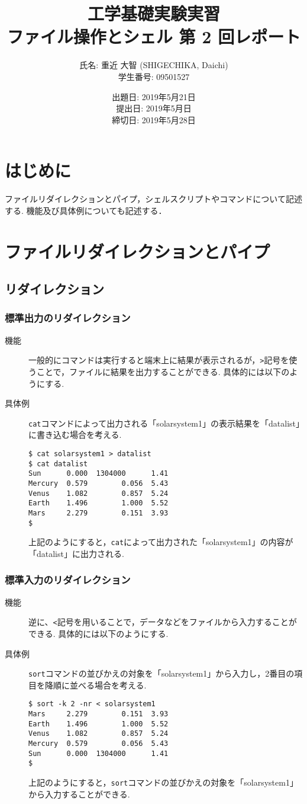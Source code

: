 \documentclass[a4j,11pt]{jarticle}
\title{工学基礎実験実習 \\
       ファイル操作とシェル 第 2 回レポート}
\author{氏名: 重近 大智 (SHIGECHIKA, Daichi) \\
        学生番号: 09501527}
\date{出題日: 2019年5月21日 \\
      提出日: 2019年5月日 \\
      締切日: 2019年5月28日 \\}  %
\begin{document}
\maketitle

\section{はじめに}
ファイルリダイレクションとパイプ，シェルスクリプトやコマンドについて記述する.
機能及び具体例についても記述する．
\section{ファイルリダイレクションとパイプ}
 \subsection{リダイレクション}
\subsubsection{標準出力のリダイレクション}
   \begin{description}
\item[機能]
一般的にコマンドは実行すると端末上に結果が表示されるが，\verb|>|記号を使うことで，ファイルに結果を出力することができる. 具体的には以下のようにする.
\item[具体例]
\verb|cat|コマンドによって出力される「solarsystem1」の表示結果を「datalist」に書き込む場合を考える.
\begin{verbatim}
$ cat solarsystem1 > datalist
$ cat datalist
Sun      0.000  1304000      1.41
Mercury  0.579        0.056  5.43
Venus    1.082        0.857  5.24
Earth    1.496        1.000  5.52
Mars     2.279        0.151  3.93
$
\end{verbatim}
上記のようにすると，\verb|cat|によって出力された「solarsystem1」の内容が「datalist」に出力される.
   \end{description}

\subsubsection{標準入力のリダイレクション}
\begin{description}
\item[機能]
逆に、\verb|<|記号を用いることで，データなどをファイルから入力することができる. 具体的には以下のようにする.
\item[具体例]
\verb|sort|コマンドの並びかえの対象を「solarsystem1」から入力し，2番目の項目を降順に並べる場合を考える.
\begin{verbatim}
$ sort -k 2 -nr < solarsystem1
Mars     2.279        0.151  3.93
Earth    1.496        1.000  5.52
Venus    1.082        0.857  5.24
Mercury  0.579        0.056  5.43
Sun      0.000  1304000      1.41
$ 
\end{verbatim}
上記のようにすると，\verb|sort|コマンドの並びかえの対象を「solarsystem1」から入力することができる.
\end{description}
\end{document}
